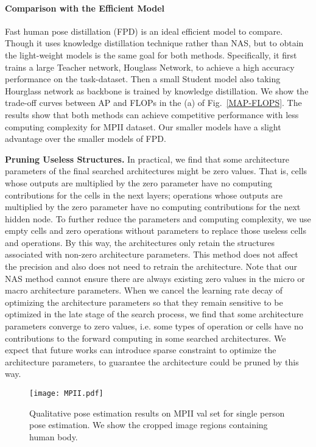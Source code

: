 \documentclass[journal]{IEEEtran}
\begin{document}
  \paragraph{Comparison with the Efficient Model}
  
  Fast human pose distillation (FPD) \cite{Zhang2018FastHP} is an ideal efficient model to compare. Though it uses knowledge distillation technique rather than NAS, but to obtain the light-weight models is the same goal for both methods. Specifically, it first trains a large Teacher network, Houglass Network, to achieve a high accuracy performance on the task-dataset. Then a small Student model also taking Hourglass network as backbone is trained by knowledge distillation. We show the trade-off curves between AP and FLOPs in the (a) of Fig.~\ref{MAP-FLOPS}. The results show that both methods can achieve competitive performance with less computing complexity for MPII dataset. Our smaller models have a slight advantage over the smaller models of FPD.

\label{prune}
\textbf{Pruning Useless Structures.} In practical, we find that some  architecture parameters of the final searched architectures might be zero values. That is, cells whose outputs are multiplied by the zero  parameter have no computing contributions for the cells in the next layers; operations whose outputs are multiplied by the zero  parameter have no computing contributions for the next hidden node. To further reduce the parameters and computing complexity, we use empty cells and zero operations without parameters to replace those useless cells and operations. By this way, the architectures only retain the structures associated with non-zero architecture parameters. This method does not affect the precision and also does not need to retrain the architecture. Note that our NAS method cannot ensure there are always existing zero values in the micro or macro architecture parameters. When we cancel the learning rate decay of optimizing the architecture parameters so that they remain sensitive to be optimized in the late stage of the search process, we find that some architecture parameters converge to zero values, i.e. some types of operation or cells have no contributions to the forward computing in some searched architectures. We expect that future works can introduce sparse constraint to optimize the architecture parameters, to guarantee the architecture could be pruned by this way.

\begin{figure*}
	
	\centering
\texttt{[image: MPII.pdf]}
	\caption{Qualitative pose estimation results on MPII val set for single person pose estimation. We show the cropped image regions containing human body.
	}
	
	\label{mpii_results}
\end{figure*}
\end{document}

